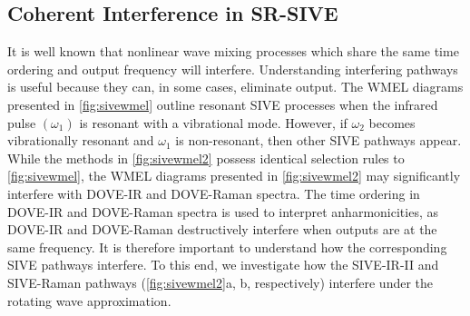 \documentclass[aip, jcp, reprint, twocolumn]{revtex4-2}
\begin{document}
\subsection{Coherent Interference in SR-SIVE}
It is well known that nonlinear wave mixing processes which share the same time ordering and output frequency will interfere. \cite{RN135, Bonn2024}
Understanding interfering pathways is useful because they can, in some cases, eliminate output. \cite{RN342, RN135}
The WMEL diagrams presented in \autoref{fig:sivewmel} outline resonant SIVE processes when the infrared pulse $(\omega_1)$ is resonant with a vibrational mode. 
However, if $\omega_2$ becomes vibrationally resonant and $\omega_1$ is non-resonant, then other SIVE pathways appear.\cite{McDonnell2024} 
While the methods in \autoref{fig:sivewmel2} possess identical selection rules to \autoref{fig:sivewmel}, the WMEL diagrams presented in \autoref{fig:sivewmel2} may significantly interfere with DOVE-IR and DOVE-Raman spectra.
The time ordering in DOVE-IR and DOVE-Raman spectra is used to interpret anharmonicities, as DOVE-IR and DOVE-Raman destructively interfere when outputs are at the same frequency. \cite{RN135, RN324}
It is therefore important to understand how the corresponding SIVE pathways interfere.
To this end, we investigate how the SIVE-IR-II and SIVE-Raman pathways (\autoref{fig:sivewmel2}a, b, respectively) interfere under the rotating wave approximation. 
\end{document}
